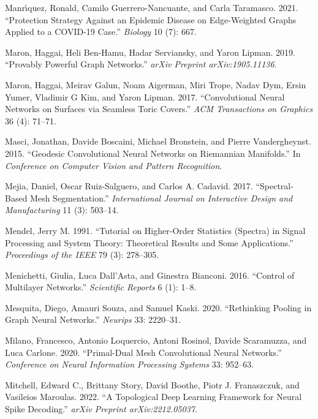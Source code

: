 \documentclass[
  12pt,
]{krantz}
\newlength{\cslhangindent}
\newenvironment{CSLReferences}[2] %
 {\begin{list}{}{%
  \setlength{\itemindent}{0pt}
  \setlength{\leftmargin}{0pt}
  \setlength{\parsep}{0pt}
  \ifodd #1
   \setlength{\leftmargin}{\cslhangindent}
   \setlength{\itemindent}{-1\cslhangindent}
  \fi
  \setlength{\itemsep}{#2\baselineskip}}}
 {\end{list}}
\begin{document}
\begin{CSLReferences}{1}{0}
Manrı́quez, Ronald, Camilo Guerrero-Nancuante, and Carla Taramasco. 2021.
{``Protection Strategy Against an Epidemic Disease on Edge-Weighted
Graphs Applied to a {COVID}-19 Case.''} \emph{Biology} 10 (7): 667.

Maron, Haggai, Heli Ben-Hamu, Hadar Serviansky, and Yaron Lipman. 2019.
{``Provably Powerful Graph Networks.''} \emph{arXiv Preprint
arXiv:1905.11136}.

Maron, Haggai, Meirav Galun, Noam Aigerman, Miri Trope, Nadav Dym, Ersin
Yumer, Vladimir G Kim, and Yaron Lipman. 2017. {``Convolutional Neural
Networks on Surfaces via Seamless Toric Covers.''} \emph{ACM
Transactions on Graphics} 36 (4): 71--71.

Masci, Jonathan, Davide Boscaini, Michael Bronstein, and Pierre
Vandergheynst. 2015. {``Geodesic Convolutional Neural Networks on
{R}iemannian Manifolds.''} In \emph{Conference on Computer Vision and
Pattern Recognition}.

Mejia, Daniel, Oscar Ruiz-Salguero, and Carlos A. Cadavid. 2017.
{``Spectral-Based Mesh Segmentation.''} \emph{International Journal on
Interactive Design and Manufacturing} 11 (3): 503--14.

Mendel, Jerry M. 1991. {``Tutorial on Higher-Order Statistics (Spectra)
in Signal Processing and System Theory: Theoretical Results and Some
Applications.''} \emph{Proceedings of the IEEE} 79 (3): 278--305.

Menichetti, Giulia, Luca Dall'Asta, and Ginestra Bianconi. 2016.
{``Control of Multilayer Networks.''} \emph{Scientific Reports} 6 (1):
1--8.

Mesquita, Diego, Amauri Souza, and Samuel Kaski. 2020. {``Rethinking
Pooling in Graph Neural Networks.''} \emph{Neurips} 33: 2220--31.

Milano, Francesco, Antonio Loquercio, Antoni Rosinol, Davide Scaramuzza,
and Luca Carlone. 2020. {``Primal-Dual Mesh Convolutional Neural
Networks.''} \emph{Conference on Neural Information Processing Systems}
33: 952--63.

Mitchell, Edward C., Brittany Story, David Boothe, Piotr J. Franaszczuk,
and Vasileios Maroulas. 2022. {``A Topological Deep Learning Framework
for Neural Spike Decoding.''} \emph{arXiv Preprint arXiv:2212.05037}.


\end{CSLReferences}
\end{document}
